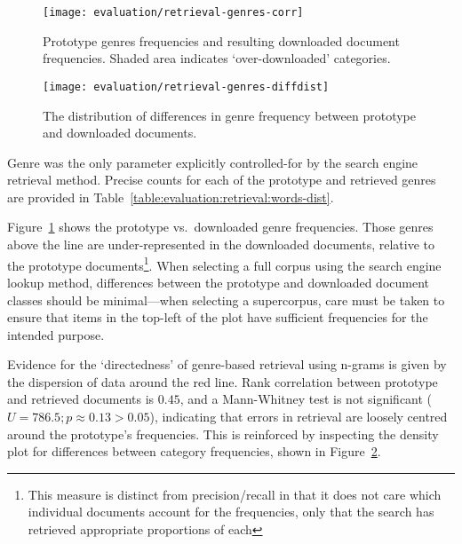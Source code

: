 \FloatBarrier{}

\begin{figure}[ht]
    \centering
    \texttt{[image: evaluation/retrieval-genres-corr]}
    \caption{Prototype genres frequencies and resulting downloaded document frequencies.  Shaded area indicates `over-downloaded' categories.}
    \label{fig:evaluation:retrieval:genres-corr}
\end{figure}


\begin{figure}[ht]
    \centering
    \texttt{[image: evaluation/retrieval-genres-diffdist]}
    \caption{The distribution of differences in genre frequency between prototype and downloaded documents.}
    \label{fig:evaluation:retrieval:genres-diffdist}
\end{figure}


Genre was the only parameter explicitly controlled-for by the search engine retrieval method.  Precise counts for each of the prototype and retrieved genres are provided in Table~\ref{table:evaluation:retrieval:words-dist}.  

Figure~\ref{fig:evaluation:retrieval:genres-corr} shows the prototype vs.\ downloaded genre frequencies.  Those genres above the line are under-represented in the downloaded documents, relative to the prototype documents\footnote{This measure is distinct from precision/recall in that it does not care which individual documents account for the frequencies, only that the search has retrieved appropriate proportions of each}.
When selecting a full corpus using the search engine lookup method, differences between the prototype and downloaded document classes should be minimal---when selecting a supercorpus, care must be taken to ensure that items in the top-left of the plot have sufficient frequencies for the intended purpose.

Evidence for the `directedness' of genre-based retrieval using n-grams is given by the dispersion of data around the red line.  Rank correlation between prototype and retrieved documents is $0.45$, and a Mann-Whitney test is not significant ($U = 786.5; p \approx 0.13 > 0.05$), indicating that errors in retrieval are loosely centred around the prototype's frequencies.  This is reinforced by inspecting the density plot for differences between category frequencies, shown in Figure~\ref{fig:evaluation:retrieval:genres-diffdist}.

